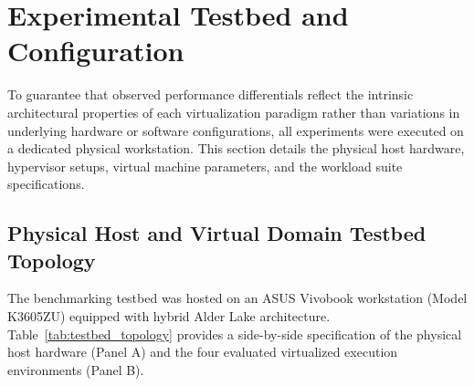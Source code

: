 \section{Experimental Testbed and Configuration}
\label{sec:experimental_environment}

To guarantee that observed performance differentials reflect the intrinsic architectural properties of each virtualization paradigm rather than variations in underlying hardware or software configurations, all experiments were executed on a dedicated physical workstation. This section details the physical host hardware, hypervisor setups, virtual machine parameters, and the workload suite specifications.

\subsection{Physical Host and Virtual Domain Testbed Topology}
\label{subsec:physical_host}

The benchmarking testbed was hosted on an ASUS Vivobook workstation (Model K3605ZU) equipped with hybrid Alder Lake architecture. Table~\ref{tab:testbed_topology} provides a side-by-side specification of the physical host hardware (Panel A) and the four evaluated virtualized execution environments (Panel B).

